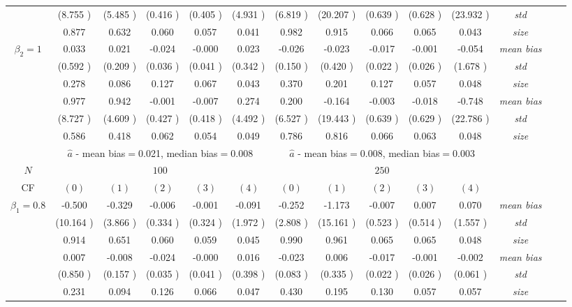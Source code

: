 \begin{table}
\begin{threeparttable}
{\begin{tabular}{|c|c|c|c|c|c|c|c|c|c|c|c|c|c|}
&(8.755 )&(5.485 )&(0.416 )&(0.405 )&(4.931 )&(6.819 )&(20.207 )&(0.639 )&(0.628 )&(23.932 )&\textit{std}\\ 
& 0.877 & 0.632 &0.060 &0.057 &0.041 &0.982& 0.915 &0.066 &0.065& 0.043 &\textit{size} \\ \midrule 
\multirow{4}{*}{$\beta_2=1$}& 0.033 & 0.021 &-0.024 &-0.000 &0.023 &-0.026& -0.023 &-0.017 &-0.001& -0.054 &\textit{mean bias} \\ 
&(0.592 )&(0.209 )&(0.036 )&(0.041 )&(0.342 )&(0.150 )&(0.420 )&(0.022 )&(0.026 )&(1.678 )&\textit{std}\\ 
& 0.278 & 0.086 &0.127 &0.067 &0.043 &0.370& 0.201 &0.127& 0.057 &0.048 &\textit{size} \\\midrule 
\multirow{4}{*}{$\beta_3=1$}& 0.977 & 0.942 &-0.001& -0.007 &0.274 &0.200 &-0.164 &-0.003 &-0.018& -0.748 &\textit{mean bias} \\ 
&(8.727 )&(4.609 )&(0.427 )&(0.418 )&(4.492 )&(6.527 )&(19.443 )&(0.639 )&(0.629 )&(22.786 )&\textit{std}\\ 
& 0.586 & 0.418 &0.062 &0.054 &0.049 &0.786& 0.816& 0.066 &0.063 &0.048 &\textit{size} \\\midrule 
&\multicolumn{5}{|c|}{$\hat{a}$ - mean bias$=$0.021, median bias$=$0.008 }&\multicolumn{5}{|c|}{$\hat{a}$ - mean bias$=$0.008, median bias$=$0.003 }&\\ \hline 
\cellcolor{yellow}$N$&\multicolumn{5}{|c|}{\cellcolor{yellow}$100$}&\multicolumn{5}{|c|}{\cellcolor{yellow}$250$}&\\\hline 
CF&$(0)$&$(1)$&$(2)$&$(3)$&$(4)$& $(0)$ &$(1)$&$(2)$&$(3)$&$(4)$&\\\hline 
\multirow{4}{*}{$\beta_1=0.8$}& -0.500 & -0.329 &-0.006 &-0.001 &-0.091 &-0.252& -1.173 &-0.007 &0.007& 0.070 &\textit{mean bias} \\ 
&(10.164 )&(3.866 )&(0.334 )&(0.324 )&(1.972 )&(2.808 )&(15.161 )&(0.523 )&(0.514 )&(1.557 )&\textit{std}\\ 
& 0.914 & 0.651 &0.060 &0.059 &0.045 &0.990& 0.961 &0.065 &0.065& 0.048 &\textit{size} \\\midrule 
\multirow{4}{*}{$\beta_2=1$}& 0.007 & -0.008 &-0.024 &-0.000 &0.016 &-0.023& 0.006 &-0.017 &-0.001& -0.002 &\textit{mean bias} \\ 
&(0.850 )&(0.157 )&(0.035 )&(0.041 )&(0.398 )&(0.083 )&(0.335 )&(0.022 )&(0.026 )&(0.061 )&\textit{std}\\ 
& 0.231 & 0.094 &0.126 &0.066 &0.047 &0.430& 0.195 &0.130& 0.057 &0.057 &\textit{size} \\ \midrule

\end{tabular}}
\end{threeparttable}
\end{table}
